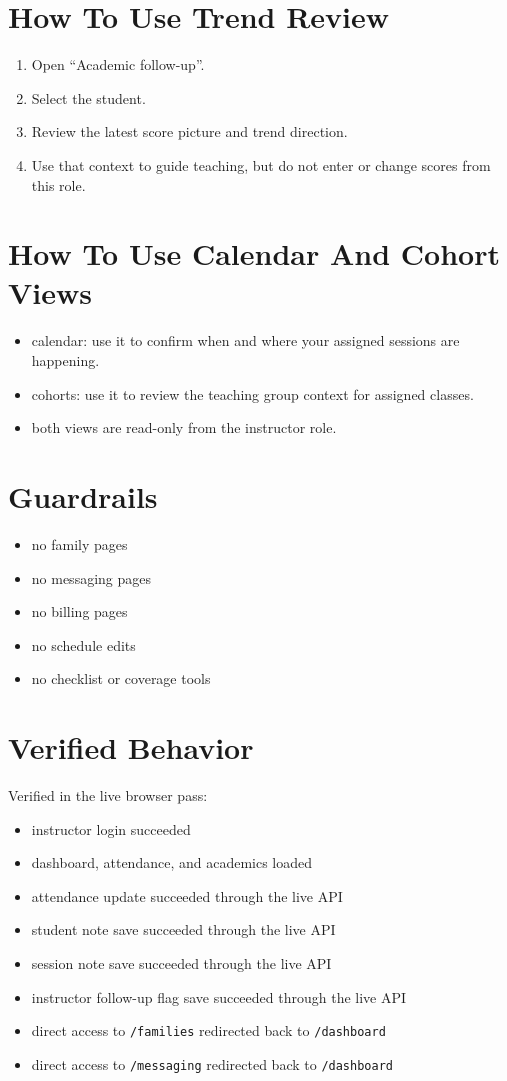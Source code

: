\documentclass[11pt]{article}
\begin{document}
\section*{How To Use Trend Review}
\begin{enumerate}
  \item Open ``Academic follow-up''.
  \item Select the student.
  \item Review the latest score picture and trend direction.
  \item Use that context to guide teaching, but do not enter or change scores from this role.
\end{enumerate}

\section*{How To Use Calendar And Cohort Views}
\begin{itemize}
  \item calendar:
  use it to confirm when and where your assigned sessions are happening.
  \item cohorts:
  use it to review the teaching group context for assigned classes.
  \item both views are read-only from the instructor role.
\end{itemize}

\section*{Guardrails}
\begin{itemize}
  \item no family pages
  \item no messaging pages
  \item no billing pages
  \item no schedule edits
  \item no checklist or coverage tools
\end{itemize}

\section*{Verified Behavior}
Verified in the live browser pass:
\begin{itemize}
  \item instructor login succeeded
  \item dashboard, attendance, and academics loaded
  \item attendance update succeeded through the live API
  \item student note save succeeded through the live API
  \item session note save succeeded through the live API
  \item instructor follow-up flag save succeeded through the live API
  \item direct access to \texttt{/families} redirected back to \texttt{/dashboard}
  \item direct access to \texttt{/messaging} redirected back to \texttt{/dashboard}
\end{itemize}
\end{document}
